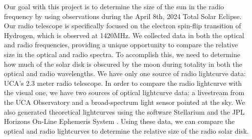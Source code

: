 Our goal with this project is to determine the size of the sun in the radio frequency by using observations during the April 8th, 2024 Total Solar Eclipse.
Our radio telescope is specifically focused on the electron spin-flip transition of Hydrogen, which is observed at 1420MHz.
We collected data in both the optical and radio frequencies, providing a unique opportunity to compare the relative size in the optical and radio spectra.
To accomplish this, we need to determine how much of the solar disk is obscured by the moon during totality in both the optical and radio wavelengths.
We have only one source of radio lightcurve data: UCA's 2.3 meter radio telescope.
In order to compare the radio lightcurve with the visual one, we have two sources of optical lightcurve data: a livestream from the UCA Observatory and a broad-spectrum light sensor pointed at the sky.
We also generated theoretical lightcurves using the software Stellarium \cite{zotti_simulated_2020} and the JPL Horizons On-Line Ephemeris System \cite{nasa_jpl_solar_system_dynamics_group_jpl_nodate}.
Using these data, we can compare the optical and radio lightcurves to determine the relative size of the radio solar disk.
